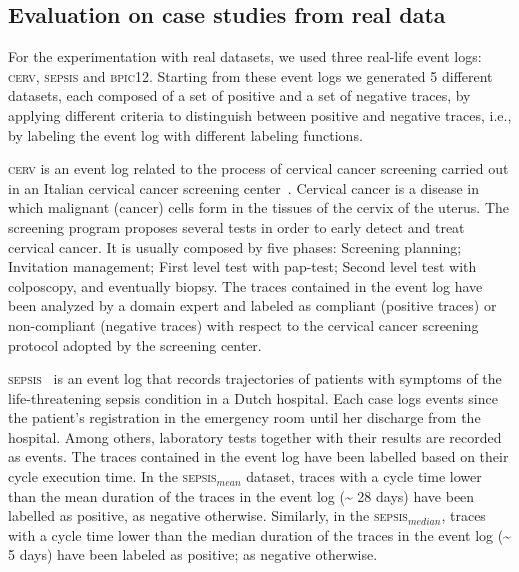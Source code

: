 \documentclass[a4wide,11pt]{article}
\theoremstyle{definition}
\theoremstyle{plain}
\begin{document}
\subsection{Evaluation on case studies from real data}
\label{sec:realdata}


For the experimentation with real datasets, we used three real-life event logs: \textsc{cerv}, \textsc{sepsis} and \textsc{bpic12}. Starting from these event logs we generated 5 different datasets, each composed of a set of positive and a set of negative traces, by applying different criteria to distinguish between positive and negative traces, i.e., by labeling the event log with different labeling functions. 

\textsc{cerv} is an event log related to the process of cervical cancer screening carried out in an Italian cervical cancer screening center~\cite{2007b-Lamma}. Cervical cancer is a disease in which malignant (cancer) cells form in the tissues of the cervix of the uterus. The screening program proposes several tests in order to early detect and treat cervical cancer. It is usually composed by five phases: Screening planning; Invitation management; First level test with pap-test; Second level test with colposcopy, and eventually biopsy. The traces contained in the event log have been analyzed by a domain expert and labeled as compliant (positive traces) or non-compliant (negative traces) with respect to the cervical cancer screening protocol adopted by the screening center.

\textsc{sepsis}~\cite{Sepsis} is an event log that records trajectories of patients with symptoms of the life-threatening sepsis condition in a Dutch hospital.
Each case logs events since the patient's registration in the emergency room until her discharge from the hospital. Among others, laboratory tests together with their results are recorded as events. The traces contained in the event log have been labelled based on their cycle execution time. In the \textsc{sepsis$_{mean}$} dataset, traces with a cycle time lower than the mean duration of the traces in the event log (\textasciitilde\xspace28 days) have been labelled as positive, as negative otherwise. Similarly, in the \textsc{sepsis$_{median}$}, traces with a cycle time lower than the median duration of the traces in the event log (\textasciitilde\xspace 5 days)  have been labeled as positive; as negative otherwise.  
\end{document}
